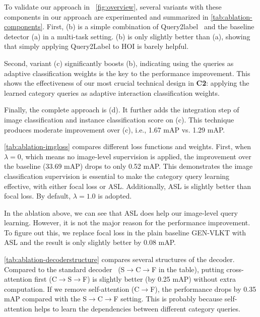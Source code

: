 \documentclass[10pt,twocolumn,letterpaper]{article}
\begin{document}
To validate our approach in ~\cref{fig:overview}, several variants with these components in our approach are experimented and summarized in \cref{tab:ablation-components}.
First, (b) is a simple combination of Query2label~\cite{liu2021query2label} and the baseline detector (a) in a multi-task setting. (b) is only slightly better than (a), showing that simply applying Query2Label to HOI is barely helpful.

Second, variant (c) significantly boosts (b), indicating using the queries as adaptive classification weights is the key to the performance improvement. This shows the effectiveness of our most crucial technical design in \textbf{C2}: applying the learned category queries as adaptive interaction classification weights.

Finally, the complete approach is (d). It further adds the integration step of image classification and instance classification score on (c). This technique produces moderate improvement over (c), i.e., 1.67 mAP vs. 1.29 mAP.

\cref{tab:ablation-imgloss} compares different loss functions and weights.
First, when $\lambda = 0$, which means no image-level supervision is applied, the improvement over the baseline (33.69 mAP) drops to only 0.52 mAP. This demonstrates the image classification supervision is essential to make the category query learning effective, with either focal loss or ASL.
Additionally, ASL is slightly better than focal loss. By default, $\lambda = 1.0$ is adopted.

In the ablation above, we can see that ASL does help our image-level query learning. However, it is not the major reason for the performance improvement. To figure out this, we replace focal loss in the plain baseline GEN-VLKT with ASL and the result is only slightly better by 0.08 mAP.

\cref{tab:ablation-decoderstructure} compares several structures of the decoder. Compared to the standard  decoder~\cite{vaswani2017attention, carion2020end} (S$\rightarrow$C$\rightarrow$F in the table), putting cross-attention first (C$\rightarrow$S$\rightarrow$F) is slightly better (by 0.25 mAP) without extra computation.
If we remove self-attention (C$\rightarrow$F), the performance drops by 0.35 mAP compared with the S$\rightarrow$C$\rightarrow$F setting. This is probably because self-attention helps to learn the dependencies between different category queries.
\end{document}
